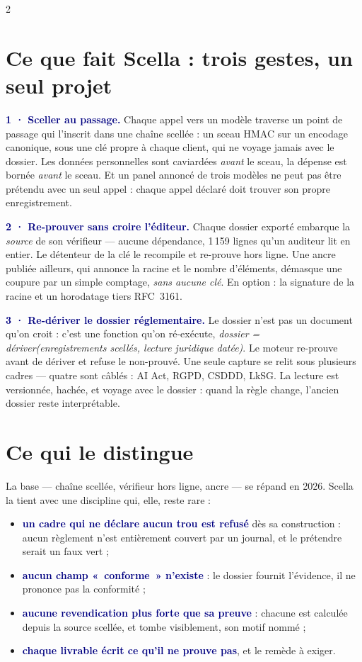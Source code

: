 \documentclass[10pt]{extarticle}
\newcommand{\mm}[1]{\textbf{\textcolor{navy}{#1}}}
\begin{document}
\begin{multicols}{2}

\section{Ce que fait Scella : trois gestes, un seul projet}

\mm{1 · Sceller au passage.} Chaque appel vers un modèle traverse un point de passage qui l'inscrit dans une chaîne
scellée : un sceau HMAC sur un encodage canonique, sous une clé propre à chaque client, qui ne voyage jamais avec le
dossier. Les données personnelles sont caviardées \emph{avant} le sceau, la dépense est bornée \emph{avant} le
sceau. Et un panel annoncé de trois modèles ne peut pas être prétendu avec un seul appel : chaque appel déclaré doit
trouver son propre enregistrement.

\mm{2 · Re-prouver sans croire l'éditeur.} Chaque dossier exporté embarque la \emph{source} de son vérifieur --- aucune
dépendance, 1\,159 lignes qu'un auditeur lit en entier. Le détenteur de la clé le recompile et re-prouve hors ligne.
Une ancre publiée ailleurs, qui annonce la racine et le nombre d'éléments, démasque une coupure par un simple
comptage, \emph{sans aucune clé}. En option : la signature de la racine et un horodatage tiers RFC~3161.

\mm{3 · Re-dériver le dossier réglementaire.} Le dossier n'est pas un document qu'on croit : c'est une fonction qu'on
ré-exécute, \emph{dossier = dériver(enregistrements scellés, lecture juridique datée)}. Le moteur re-prouve avant de
dériver et refuse le non-prouvé. Une seule capture se relit sous plusieurs cadres --- quatre sont câblés : AI Act, RGPD, CSDDD, LkSG. La lecture
est versionnée, hachée, et voyage avec le dossier : quand la règle change, l'ancien dossier reste interprétable.

\section{Ce qui le distingue}

La base --- chaîne scellée, vérifieur hors ligne, ancre --- se répand en 2026. Scella la tient avec une discipline
qui, elle, reste rare :
\begin{itemize}[leftmargin=1.1em,itemsep=1pt,topsep=1pt]
\item \mm{un cadre qui ne déclare aucun trou est refusé} dès sa construction : aucun règlement n'est entièrement
couvert par un journal, et le prétendre serait un faux vert ;
\item \mm{aucun champ «~conforme~» n'existe} : le dossier fournit l'évidence, il ne prononce pas la conformité ;
\item \mm{aucune revendication plus forte que sa preuve} : chacune est calculée depuis la source scellée, et tombe
visiblement, son motif nommé ;
\item \mm{chaque livrable écrit ce qu'il ne prouve pas}, et le remède à exiger.
\end{itemize}


\end{multicols}
\end{document}
